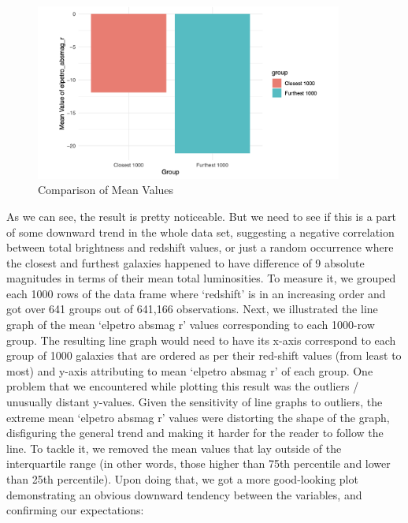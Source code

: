 \documentclass[12pt]{article}
\begin{document}
\begin{figure}[h]
	\centering
	\includegraphics[width=0.9\textwidth]{pic/r2g1.png}
	\caption{Comparison of Mean Values}
\end{figure}
\noindent
As we can see, the result is pretty noticeable. But we need to see if this is a part of some downward trend in the whole data set, suggesting a negative correlation between total brightness and redshift values, or just a random occurrence where the closest and furthest galaxies happened to have difference of 9 absolute magnitudes in terms of their mean total luminosities. To measure it, we grouped each 1000 rows of the data frame where ‘redshift’ is in an increasing order and got over 641 groups out of 641,166 observations. Next, we illustrated the line graph of the mean ‘elpetro absmag r’ values corresponding to each 1000-row group. The resulting line graph would need to have its x-axis correspond to each group of 1000 galaxies that are ordered as per their red-shift values (from least to most) and y-axis attributing to mean ‘elpetro absmag r’ of each group. One problem that we encountered while plotting this result was the outliers / unusually distant y-values. Given the sensitivity of line graphs to outliers, the extreme mean ‘elpetro absmag r’ values were distorting the shape of the graph, disfiguring the general trend and making it harder for the reader to follow the line. To tackle it, we removed the mean values that lay outside of the interquartile range (in other words, those higher than 75th percentile and lower than 25th percentile). Upon doing that, we got a more good-looking plot demonstrating an obvious downward tendency between the variables, and confirming our expectations:
\end{document}
